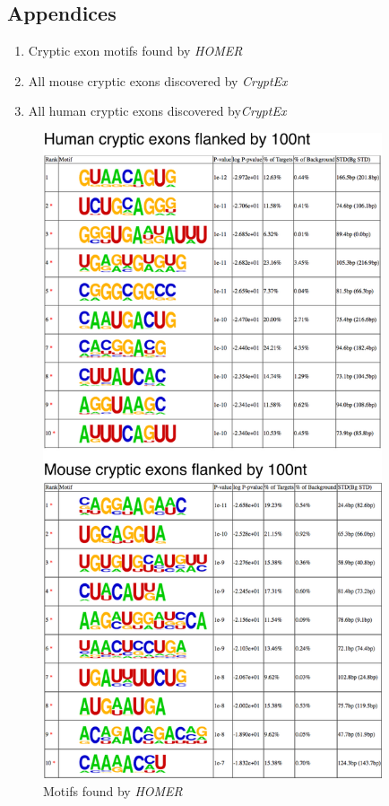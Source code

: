 
\begin{appendices}
	\section*{Appendices}
	\begin{enumerate}
		\item Cryptic exon motifs found by \textit{HOMER}\\
		\item All mouse cryptic exons discovered by \textit{CryptEx}\\ 
		\item All human cryptic exons discovered by\textit{CryptEx}\\
	\end{enumerate}

\clearpage	


\begin{figure}
	\begin{center}
		\includegraphics[width=10cm]{Figures/03_cryptic_exons/Figure_S4_HOMER.png}
	\end{center}
	\caption{Motifs found by \textit{HOMER}}
\end{figure}



\end{appendices}
